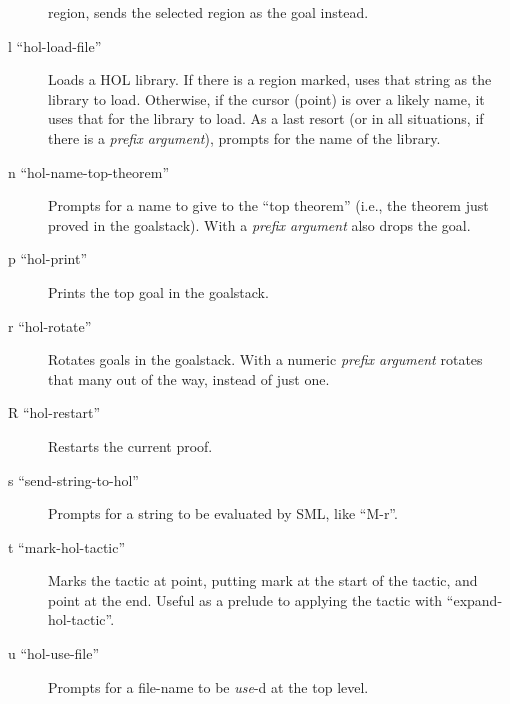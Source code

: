 \documentclass[10pt]{article}
\begin{document}
\begin{description}
  region, sends the selected region as the goal instead.
\item [l ``hol-load-file''] Loads a HOL library.  If there is a region
  marked, uses that string as the library to load.  Otherwise, if the
  cursor (point) is over a likely name, it uses that for the library
  to load.  As a last resort (or in all situations, if there is a
  \emph{prefix argument}), prompts for the name of the library.
\item [n ``hol-name-top-theorem''] Prompts for a name to give to the
  ``top theorem'' (i.e., the theorem just proved in the goalstack).
  With a \emph{prefix argument} also drops the goal.
\item [p ``hol-print''] Prints the top goal in the goalstack.
\item [r ``hol-rotate''] Rotates goals in the goalstack.  With a
  numeric \emph{prefix argument} rotates that many out of the way,
  instead of just one.
\item [R ``hol-restart''] Restarts the current proof.
\item [s ``send-string-to-hol''] Prompts for a string to be evaluated
  by SML, like ``M-r''.
\item [t ``mark-hol-tactic''] Marks the tactic at point, putting mark
  at the start of the tactic, and point at the end.  Useful as a
  prelude to applying the tactic with ``expand-hol-tactic''.
\item [u ``hol-use-file''] Prompts for a file-name to be \emph{use}-d
  at the top level.

\end{description}
\end{document}
